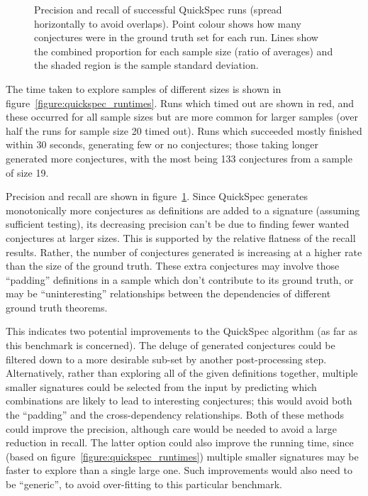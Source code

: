 \begin{figure}
  \centering
  
  \caption{Precision and recall of successful QuickSpec runs (spread
    horizontally to avoid overlaps). Point colour shows how many conjectures
    were in the ground truth set for each run. Lines show the combined
    proportion for each sample size (ratio of averages) and the shaded region is
    the sample standard deviation.}
  \label{figure:quickspec_precRec}
\end{figure}

The time taken to explore samples of different sizes is shown in
figure~\ref{figure:quickspec_runtimes}. Runs which timed out are shown in red,
and these occurred for all sample sizes but are more common for larger samples
(over half the runs for sample size 20 timed out). Runs which succeeded mostly
finished within 30 seconds, generating few or no conjectures; those taking
longer generated more conjectures, with the most being 133 conjectures from a
sample of size 19.

Precision and recall are shown in figure~\ref{figure:quickspec_precRec}.
Since QuickSpec generates monotonically more conjectures as definitions are
added to a signature (assuming sufficient testing), its decreasing precision
can't be due to finding fewer wanted conjectures at larger sizes. This is
supported by the relative flatness of the recall results. Rather, the number of
conjectures generated is increasing at a higher rate than the size of the ground
truth. These extra conjectures may involve those ``padding'' definitions in a
sample which don't contribute to its ground truth, or may be ``uninteresting''
relationships between the dependencies of different ground truth theorems.

This indicates two potential improvements to the QuickSpec algorithm (as far as
this benchmark is concerned). The deluge of generated conjectures could be
filtered down to a more desirable sub-set by another post-processing step.
Alternatively, rather than exploring all of the given definitions together,
multiple smaller signatures could be selected from the input by predicting which
combinations are likely to lead to interesting conjectures; this would avoid
both the ``padding'' and the cross-dependency relationships. Both of these
methods could improve the precision, although care would be needed to avoid a
large reduction in recall. The latter option could also improve the running
time, since (based on figure~\ref{figure:quickspec_runtimes}) multiple smaller
signatures may be faster to explore than a single large one. Such improvements
would also need to be ``generic'', to avoid over-fitting to this particular
benchmark.

